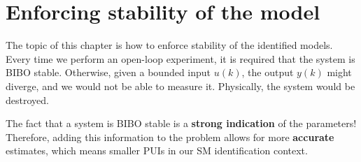 \chapter{Enforcing stability of the model}
The topic of this chapter is how to enforce stability of the identified models.\\

Every time we perform an open-loop experiment, it is required that the system is BIBO stable. Otherwise, given a bounded input \( u(k) \), the output \( y(k) \) might diverge, and we would not be able to measure it. Physically, the system would be destroyed. 

The fact that a system is BIBO stable is a \textbf{strong indication} of the parameters! Therefore, adding this information to the problem allows for more \textbf{accurate} estimates, which means smaller PUIs in our SM identification context.\\

